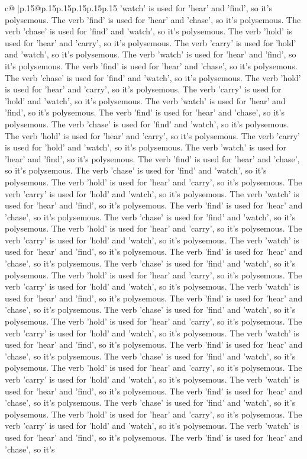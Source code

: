 \documentclass{article}
\begin{document}
{\begin{supertabular}{c@{$\;$}|p{.15\linewidth}@{}p{.15\linewidth}p{.15\linewidth}p{.15\linewidth}p{.15\linewidth}p{.15\linewidth}}
{{{'watch' is used for 'hear' and 'find', so it's polysemous. The verb 'find' is used for 'hear' and 'chase', so it's polysemous. The verb 'chase' is used for 'find' and 'watch', so it's polysemous. The verb 'hold' is used for 'hear' and 'carry', so it's polysemous. The verb 'carry' is used for 'hold' and 'watch', so it's polysemous. The verb 'watch' is used for 'hear' and 'find', so it's polysemous. The verb 'find' is used for 'hear' and 'chase', so it's polysemous. The verb 'chase' is used for 'find' and 'watch', so it's polysemous. The verb 'hold' is used for 'hear' and 'carry', so it's polysemous. The verb 'carry' is used for 'hold' and 'watch', so it's polysemous. The verb 'watch' is used for 'hear' and 'find', so it's polysemous. The verb 'find' is used for 'hear' and 'chase', so it's polysemous. The verb 'chase' is used for 'find' and 'watch', so it's polysemous. The verb 'hold' is used for 'hear' and 'carry', so it's polysemous. The verb 'carry' is used for 'hold' and 'watch', so it's polysemous. The verb 'watch' is used for 'hear' and 'find', so it's polysemous. The verb 'find' is used for 'hear' and 'chase', so it's polysemous. The verb 'chase' is used for 'find' and 'watch', so it's polysemous. The verb 'hold' is used for 'hear' and 'carry', so it's polysemous. The verb 'carry' is used for 'hold' and 'watch', so it's polysemous. The verb 'watch' is used for 'hear' and 'find', so it's polysemous. The verb 'find' is used for 'hear' and 'chase', so it's polysemous. The verb 'chase' is used for 'find' and 'watch', so it's polysemous. The verb 'hold' is used for 'hear' and 'carry', so it's polysemous. The verb 'carry' is used for 'hold' and 'watch', so it's polysemous. The verb 'watch' is used for 'hear' and 'find', so it's polysemous. The verb 'find' is used for 'hear' and 'chase', so it's polysemous. The verb 'chase' is used for 'find' and 'watch', so it's polysemous. The verb 'hold' is used for 'hear' and 'carry', so it's polysemous. The verb 'carry' is used for 'hold' and 'watch', so it's polysemous. The verb 'watch' is used for 'hear' and 'find', so it's polysemous. The verb 'find' is used for 'hear' and 'chase', so it's polysemous. The verb 'chase' is used for 'find' and 'watch', so it's polysemous. The verb 'hold' is used for 'hear' and 'carry', so it's polysemous. The verb 'carry' is used for 'hold' and 'watch', so it's polysemous. The verb 'watch' is used for 'hear' and 'find', so it's polysemous. The verb 'find' is used for 'hear' and 'chase', so it's polysemous. The verb 'chase' is used for 'find' and 'watch', so it's polysemous. The verb 'hold' is used for 'hear' and 'carry', so it's polysemous. The verb 'carry' is used for 'hold' and 'watch', so it's polysemous. The verb 'watch' is used for 'hear' and 'find', so it's polysemous. The verb 'find' is used for 'hear' and 'chase', so it's polysemous. The verb 'chase' is used for 'find' and 'watch', so it's polysemous. The verb 'hold' is used for 'hear' and 'carry', so it's polysemous. The verb 'carry' is used for 'hold' and 'watch', so it's polysemous. The verb 'watch' is used for 'hear' and 'find', so it's polysemous. The verb 'find' is used for 'hear' and 'chase', so it's }}}
\end{supertabular}}
\end{document}
